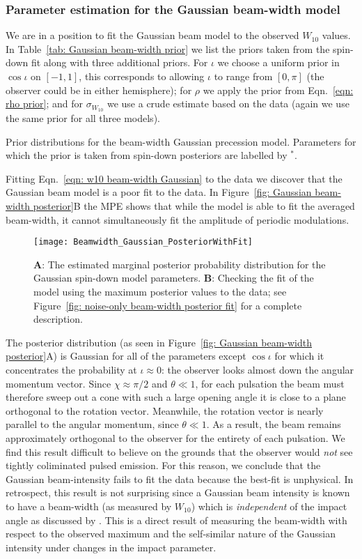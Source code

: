 \documentclass[../full_thesis/full_thesis.tex]{subfiles}
\newcommand{\thisdir}{../comparing_periodic_modulations}
\newcommand{\bigfigurecaptions}[2]{
$\textbf{A}$: The estimated marginal posterior probability distribution for the
#1 #2 model parameters. $\textbf{B}$: Checking the fit of the model using the
maximum posterior values to the data; see Figure~\ref{fig: noise-only beam-width
posterior fit} for a complete description.}
\begin{document}
\subsubsection{Parameter estimation for the Gaussian beam-width model}

We are in a position to fit the Gaussian beam model to the observed $W_{10}$
values. In Table~\ref{tab: Gaussian beam-width prior} we list the priors taken
from the spin-down fit along with three additional priors. For $\iota$ we
choose a uniform prior in $\cos\iota$ on $[-1, 1]$, this corresponds to
allowing $\iota$ to range from $[0, \pi]$ (the observer could be in either
hemisphere); for $\rho$ we apply the prior from Eqn.~\eqref{eqn: rho
prior}; and for $\sigma_{W_{10}}$ we use a crude estimate based on the
data (again we use the same prior for all three models).
\begin{table}[htb]
\small
\centering
\caption{Prior distributions for the beam-width Gaussian precession model. Parameters
for which the prior is taken from spin-down posteriors are labelled by $^{*}$.}
\label{tab: Gaussian beam-width prior}

\end{table}

Fitting Eqn.~\eqref{eqn: w10 beam-width Gaussian} to the data we discover that
the Gaussian beam model is a poor fit to the data. In Figure~\ref{fig: Gaussian
beam-width posterior}B the MPE shows that while the model is able to fit the
averaged beam-width, it cannot simultaneously fit the amplitude of periodic
modulations.
\begin{figure*}
\centering
\texttt{[image: Beamwidth\_Gaussian\_PosteriorWithFit]}
\caption{\bigfigurecaptions{Gaussian}{spin-down}}
\label{fig: Gaussian beam-width posterior}
\end{figure*}

The posterior distribution (as seen in Figure~\ref{fig: Gaussian beam-width
posterior}A) is Gaussian for all of the parameters except $\cos\iota$ for which
it concentrates the probability at $\iota\approx0$: the observer looks almost
down the angular momentum vector. Since $\chi\approx\pi/2$ and $\theta \ll 1$,
for each pulsation the beam must therefore sweep out a cone with such a large opening angle
it is close to a plane orthogonal to the rotation vector. Meanwhile, the
rotation vector is nearly parallel to the angular momentum, since $\theta \ll
1$. As a result, the beam remains approximately orthogonal to the observer for
the entirety of each pulsation.  We find this result difficult to believe on
the grounds that the observer would \emph{not} see tightly coliminated pulsed
emission.  For this reason, we conclude that the Gaussian beam-intensity fails
to fit the data because the best-fit is unphysical.
In retrospect, this result is not surprising since a Gaussian beam intensity is
known to have a beam-width (as measured by $W_{10}$) which is \emph{independent} of
the impact angle as discussed by \citet{Akgun2006}. This is a direct result of
measuring the beam-width with respect to the observed maximum and the self-similar
nature of the Gaussian intensity under changes in the impact parameter.
\end{document}
